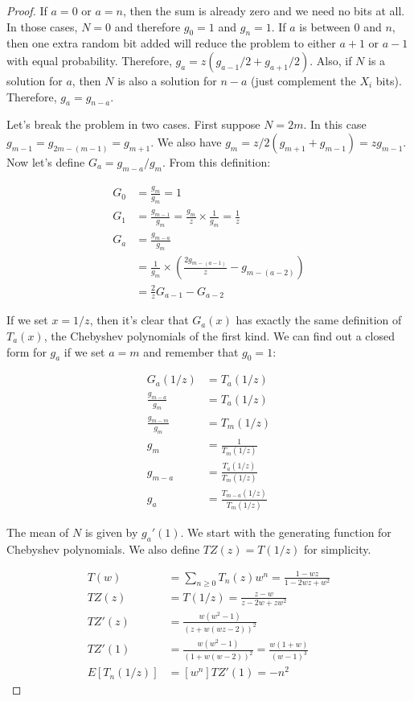 \documentclass[10pt]{book}
\begin{document}
\begin{proof}

If $a=0$ or $a=n$, then the sum is already zero and we need no bits at all. In those cases, $N=0$ and therefore $g_0=1$ and $g_n=1$. If $a$ is between $0$ and $n$, then one extra random bit added will reduce the problem to either $a+1$ or $a-1$ with equal probability. Therefore, $g_a=z\left(g_{a-1}/2 + g_{a+1}/2\right)$. Also, if $N$ is a solution for $a$, then $N$ is also a solution for $n-a$ (just complement the $X_i$ bits). Therefore, $g_a=g_{n-a}$.

Let's break the problem in two cases. First suppose $N=2m$. In this case $g_{m-1}=g_{2m-(m-1)}=g_{m+1}$. We also have $g_m=z/2(g_{m+1}+g_{m-1})=z g_{m-1}$. Now let's define $G_a=g_{m-a}/ g_m$. From this definition:

\begin{align*}
  G_0 &= \frac{g_m}{g_m} = 1 \\
  G_1 &= \frac{g_{m-1}}{g_m} = \frac{g_m}{z}\times\frac{1}{g_m} = \frac{1}{z} \\
  G_a &= \frac{g_{m-a}}{g_m} \\
      &= \frac{1}{g_m}\times\left(\frac{2g_{m-(a-1)}}{z}-g_{m-(a-2)}\right)\\
      &= \frac{2}{z}G_{a-1}-G_{a-2}
\end{align*}

If we set $x=1/z$, then it's clear that $G_a(x)$ has exactly the same definition of $T_a(x)$, the Chebyshev polynomials of the first kind. We can find out a closed form for $g_a$ if we set $a=m$ and remember that $g_0=1$:

\begin{align*}
  G_a(1/z) &= T_a(1/z) \\
  \frac{g_{m-a}}{g_m} &= T_a(1/z) \\
  \frac{g_{m-m}}{g_m} &= T_m(1/z) \\
  g_m &= \frac{1}{T_m(1/z)} \\
  g_{m-a} &= \frac{T_a(1/z)}{T_m(1/z)} \\
  g_a &= \frac{T_{m-a}(1/z)}{T_m(1/z)}
\end{align*}

The mean of $N$ is given by $g_a'(1)$. We start with the generating function for Chebyshev polynomials. We also define $TZ(z)=T(1/z)$ for simplicity.

\begin{align*}
  T(w) &= \sum_{n\ge 0}T_n(z)w^n=\frac{1-wz}{1-2wz+w^2} \\
  TZ(z) &= T(1/z) = \frac{z-w}{z-2w+zw^2}\\
  TZ'(z) &= \frac{w(w^2-1)}{(z+w(wz-2))^2} \\
  TZ'(1) &= \frac{w(w^2-1)}{(1+w(w-2))^2} = \frac{w(1+w)}{(w-1)^3}\\
  E[T_n(1/z)] &= [w^n]TZ'(1) = -n^2
\end{align*}


\end{proof}
\end{document}

